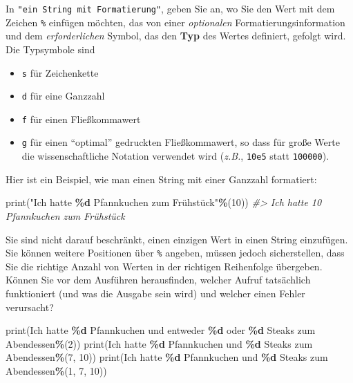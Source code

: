 \documentclass[
]{book}
\newenvironment{Shaded}{\begin{snugshade}}{\end{snugshade}}
\newcommand{\BuiltInTok}[1]{#1}
\newcommand{\CommentTok}[1]{\textcolor[rgb]{0.56,0.35,0.01}{\textit{#1}}}
\newcommand{\DecValTok}[1]{\textcolor[rgb]{0.00,0.00,0.81}{#1}}
\newcommand{\NormalTok}[1]{#1}
\newcommand{\OperatorTok}[1]{\textcolor[rgb]{0.81,0.36,0.00}{\textbf{#1}}}
\newcommand{\SpecialCharTok}[1]{\textcolor[rgb]{0.81,0.36,0.00}{\textbf{#1}}}
\newcommand{\StringTok}[1]{\textcolor[rgb]{0.31,0.60,0.02}{#1}}
\providecommand{\tightlist}{%
  \setlength{\itemsep}{0pt}\setlength{\parskip}{0pt}}
\begin{document}
In \texttt{"ein\ String\ mit\ Formatierung"}, geben Sie an, wo Sie den Wert mit dem Zeichen \texttt{\%} einfügen möchten, das von einer \emph{optionalen} Formatierungsinformation und dem \emph{erforderlichen} Symbol, das den \textbf{Typ} des Wertes definiert, gefolgt wird. Die Typsymbole sind

\begin{itemize}
\tightlist
\item
  \texttt{s} für Zeichenkette
\item
  \texttt{d} für eine Ganzzahl
\item
  \texttt{f} für einen Fließkommawert
\item
  \texttt{g} für einen ``optimal'' gedruckten Fließkommawert, so dass für große Werte die wissenschaftliche Notation verwendet wird (\emph{z.B.}, \texttt{10e5} statt \texttt{100000}).
\end{itemize}

Hier ist ein Beispiel, wie man einen String mit einer Ganzzahl formatiert:

\begin{Shaded}
\begin{Highlighting}[]
\BuiltInTok{print}\NormalTok{(}\StringTok{"Ich hatte }\SpecialCharTok{\%d}\StringTok{ Pfannkuchen zum Frühstück"}\OperatorTok{\%}\NormalTok{(}\DecValTok{10}\NormalTok{))}
\CommentTok{\#\textgreater{} Ich hatte 10 Pfannkuchen zum Frühstück}
\end{Highlighting}
\end{Shaded}

Sie sind nicht darauf beschränkt, einen einzigen Wert in einen String einzufügen. Sie können weitere Positionen über \texttt{\%} angeben, müssen jedoch sicherstellen, dass Sie die richtige Anzahl von Werten in der richtigen Reihenfolge übergeben. Können Sie vor dem Ausführen herausfinden, welcher Aufruf tatsächlich funktioniert (und was die Ausgabe sein wird) und welcher einen Fehler verursacht?

\begin{Shaded}
\begin{Highlighting}[]
\BuiltInTok{print}\NormalTok{(}\StringTok{\textquotesingle{}Ich hatte }\SpecialCharTok{\%d}\StringTok{ Pfannkuchen und entweder }\SpecialCharTok{\%d}\StringTok{ oder }\SpecialCharTok{\%d}\StringTok{ Steaks zum Abendessen\textquotesingle{}}\OperatorTok{\%}\NormalTok{(}\DecValTok{2}\NormalTok{))}
\BuiltInTok{print}\NormalTok{(}\StringTok{\textquotesingle{}Ich hatte }\SpecialCharTok{\%d}\StringTok{ Pfannkuchen und }\SpecialCharTok{\%d}\StringTok{ Steaks zum Abendessen\textquotesingle{}}\OperatorTok{\%}\NormalTok{(}\DecValTok{7}\NormalTok{, }\DecValTok{10}\NormalTok{))}
\BuiltInTok{print}\NormalTok{(}\StringTok{\textquotesingle{}Ich hatte }\SpecialCharTok{\%d}\StringTok{ Pfannkuchen und }\SpecialCharTok{\%d}\StringTok{ Steaks zum Abendessen\textquotesingle{}}\OperatorTok{\%}\NormalTok{(}\DecValTok{1}\NormalTok{, }\DecValTok{7}\NormalTok{, }\DecValTok{10}\NormalTok{))}
\end{Highlighting}
\end{Shaded}
\end{document}
